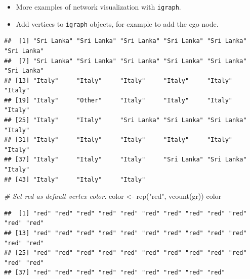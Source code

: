\documentclass[
]{book}
\newenvironment{Shaded}{\begin{snugshade}}{\end{snugshade}}
\newcommand{\CommentTok}[1]{\textcolor[rgb]{0.56,0.35,0.01}{\textit{#1}}}
\newcommand{\FloatTok}[1]{\textcolor[rgb]{0.00,0.00,0.81}{#1}}
\newcommand{\FunctionTok}[1]{\textcolor[rgb]{0.00,0.00,0.00}{#1}}
\newcommand{\NormalTok}[1]{#1}
\newcommand{\OtherTok}[1]{\textcolor[rgb]{0.56,0.35,0.01}{#1}}
\newcommand{\SpecialCharTok}[1]{\textcolor[rgb]{0.00,0.00,0.00}{#1}}
\newcommand{\StringTok}[1]{\textcolor[rgb]{0.31,0.60,0.02}{#1}}
\providecommand{\tightlist}{%
  \setlength{\itemsep}{0pt}\setlength{\parskip}{0pt}}
\begin{document}
\begin{itemize}
\tightlist
\item
  More examples of network visualization with \texttt{igraph}.
\item
  Add vertices to \texttt{igraph} objects, for example to add the ego node.
\end{itemize}

\begin{Shaded}
\end{Shaded}

\begin{verbatim}
##  [1] "Sri Lanka" "Sri Lanka" "Sri Lanka" "Sri Lanka" "Sri Lanka" "Sri Lanka"
##  [7] "Sri Lanka" "Sri Lanka" "Sri Lanka" "Sri Lanka" "Sri Lanka" "Sri Lanka"
## [13] "Italy"     "Italy"     "Italy"     "Italy"     "Italy"     "Italy"    
## [19] "Italy"     "Other"     "Italy"     "Italy"     "Italy"     "Italy"    
## [25] "Italy"     "Italy"     "Sri Lanka" "Sri Lanka" "Sri Lanka" "Italy"    
## [31] "Italy"     "Italy"     "Italy"     "Italy"     "Italy"     "Italy"    
## [37] "Italy"     "Italy"     "Italy"     "Sri Lanka" "Sri Lanka" "Italy"    
## [43] "Italy"     "Italy"     "Italy"
\end{verbatim}

\begin{Shaded}
\begin{Highlighting}[]
\CommentTok{\# Set red as default vertex color.}
\NormalTok{color }\OtherTok{\textless{}{-}} \FunctionTok{rep}\NormalTok{(}\StringTok{"red"}\NormalTok{, }\FunctionTok{vcount}\NormalTok{(gr))}
\NormalTok{color}
\end{Highlighting}
\end{Shaded}

\begin{verbatim}
##  [1] "red" "red" "red" "red" "red" "red" "red" "red" "red" "red" "red" "red"
## [13] "red" "red" "red" "red" "red" "red" "red" "red" "red" "red" "red" "red"
## [25] "red" "red" "red" "red" "red" "red" "red" "red" "red" "red" "red" "red"
## [37] "red" "red" "red" "red" "red" "red" "red" "red" "red"
\end{verbatim}
\end{document}
